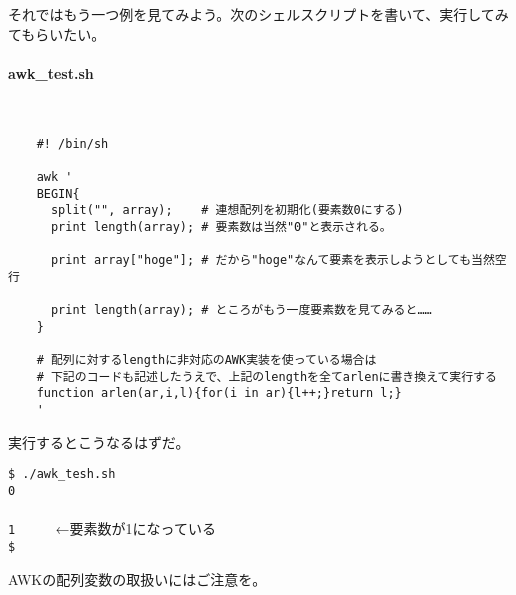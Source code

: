 それではもう一つ例を見てみよう。次のシェルスクリプトを書いて、実行してみてもらいたい。

\paragraph{awk\_{}test.sh} 　\\
\begin{frameboxit}{160.0mm}
\begin{verbatim}
	#! /bin/sh

	awk '
	BEGIN{
	  split("", array);    # 連想配列を初期化(要素数0にする)
	  print length(array); # 要素数は当然"0"と表示される。

	  print array["hoge"]; # だから"hoge"なんて要素を表示しようとしても当然空行

	  print length(array); # ところがもう一度要素数を見てみると……
	}
	
	# 配列に対するlengthに非対応のAWK実装を使っている場合は
	# 下記のコードも記述したうえで、上記のlengthを全てarlenに書き換えて実行する
	function arlen(ar,i,l){for(i in ar){l++;}return l;}
	'
\end{verbatim}
\end{frameboxit}

実行するとこうなるはずだ。

\begin{screen}
	\verb|$ ./awk_tesh.sh| \return \\
	\verb|0| \\
	\verb|| \\
	\verb|1     | ←要素数が1になっている \\
	\verb|$ |
\end{screen}

AWKの配列変数の取扱いにはご注意を。
